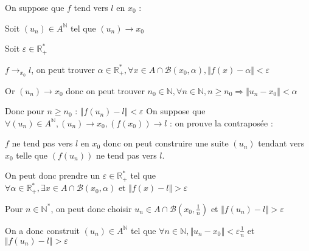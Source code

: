 \documentclass[a4paper,12pt]{book}
\newcommand{\Pre}[1]{\begin{tcolorbox}[sharp corners, colback=white,colframe=green!60!green!30!black!75, title=Preuve]#1\end{tcolorbox}}
\def\R{\mathbb{R}}
\def\N{\mathbb{N}}
\begin{document}
\Pre{On suppose que $f$ tend vers $l$ en $x_0$ : \par Soit $(u_n)\in A^\N$ tel que $(u_n)\to x_0$ \par Soit $\varepsilon\in\R_+^*$ \par $f\to_{x_0} l$, on peut trouver $\alpha\in\R_+^*, \forall x\in A\cap\mathcal{B}(x_0,\alpha), \Vert f(x)-\alpha\Vert<\varepsilon$ \par Or $(u_n)\to x_0$ donc on peut trouver $n_0\in\N,\forall n\in\N, n\geq n_0\Rightarrow \Vert u_n-x_0\Vert<\alpha$ \par Donc pour $n\geq n_0$ : $\Vert f(u_n)-l\Vert<\varepsilon$
On suppose que $\forall (u_n)\in A^\N, (u_n)\to x_0, (f(x_0))\to l$ : on prouve la contraposée : \par $f$ ne tend pas vers $l$ en $x_0$ donc on peut construire une suite $(u_n)$ tendant vers $x_0$ telle que $(f(u_n))$ ne tend pas vers $l$. \par On peut donc prendre un $\varepsilon\in\R_+^*$ tel que $\forall\alpha\in\R_+^*,\exists x\in A\cap\mathcal{B}(x_0,\alpha)\text{ et }\Vert f(x)-l\Vert>\varepsilon$ \par Pour $n\in\N^*$, on peut donc choisir $u_n\in A\cap\mathcal{B}(x_0,\frac{1}{n})$ et $\Vert f(u_n)-l\Vert>\varepsilon$ \par On a donc construit $(u_n)\in A^\N$ tel que $\forall n\in\N, \Vert u_n-x_0\Vert<\varepsilon\frac{1}{n}$ et $\Vert f(u_n)-l\Vert>\varepsilon$}
\end{document}
